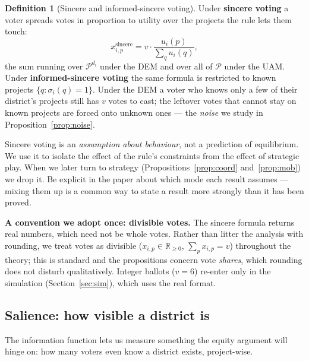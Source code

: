 \documentclass[11pt,letterpaper]{article}
\theoremstyle{definition}
\newtheorem{definition}{Definition}[section]
\theoremstyle{plain}
\theoremstyle{remark}
\newcommand{\R}{\mathbb{R}}
\newcommand{\Pset}{\mathcal{P}}
\newcommand{\votes}{v}
\begin{document}
\begin{definition}[Sincere and informed-sincere voting]
\label{def:sincere}
Under \textbf{sincere voting} a voter spreads votes in proportion to utility over the projects the
rule lets them touch:
\[
  x_{i,p}^{\text{sincere}}=\votes\cdot\frac{u_i(p)}{\sum_{q}u_i(q)},
\]
the sum running over $\Pset^{d_i}$ under the DEM and over all of $\Pset$ under the UAM. Under
\textbf{informed-sincere voting} the same formula is restricted to known projects
$\{q:\sigma_i(q)=1\}$. Under the DEM a voter who knows only a few of their district's projects
still has $\votes$ votes to cast; the leftover votes that cannot stay on known projects are forced
onto unknown ones --- the \emph{noise} we study in Proposition~\ref{prop:noise}.
\end{definition}

\begin{watchout}
Sincere voting is an \emph{assumption about behaviour}, not a prediction of equilibrium. We use it
to isolate the effect of the rule's constraints from the effect of strategic play. When we later
turn to strategy (Propositions~\ref{prop:coord} and~\ref{prop:mob}) we drop it. Be explicit in the
paper about which mode each result assumes --- mixing them up is a common way to state a result more
strongly than it has been proved.
\end{watchout}

\begin{aside}\small
\textbf{A convention we adopt once: divisible votes.} The sincere formula returns real numbers,
which need not be whole votes. Rather than litter the analysis with rounding, we treat votes as
divisible ($x_{i,p}\in\R_{\ge0}$, $\sum_p x_{i,p}=\votes$) throughout the theory; this is standard
and the propositions concern vote \emph{shares}, which rounding does not disturb qualitatively.
Integer ballots ($\votes=6$) re-enter only in the simulation (Section~\ref{sec:sim}), which uses
the real format.
\end{aside}

\subsection{Salience: how visible a district is}

The information function lets us measure something the equity argument will hinge on: how many
voters even know a district exists, project-wise.
\end{document}
